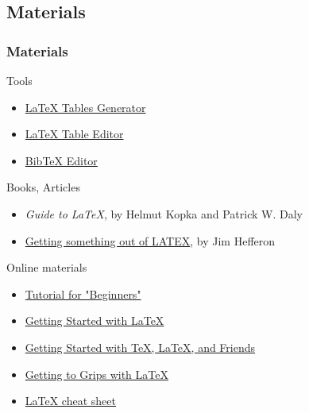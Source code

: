 \documentclass[slidestop,compress,mathserif]{beamer}
\begin{document}
\subsection[Materials]{Materials}
\begin{frame} 
		\frametitle{Materials}

		Tools
		\begin{itemize}
			\item \href{http://www.tablesgenerator.com/latex_tables}{LaTeX Tables Generator}
			\item \href{http://truben.no/table/}{LaTeX Table Editor}
			\item \href{http://truben.no/latex/bibtex/}{BibTeX Editor}
		\end{itemize}
		
		Books, Articles
		\begin{itemize}
			\item \emph{Guide to LaTeX}, by Helmut Kopka and Patrick W. Daly
			\item \href{http://mirror.physik-pool.tu-berlin.de/tex-archive/info/first-latex-doc/first-latex-doc.pdf}{Getting something out of LATEX}, by Jim Hef­feron
		\end{itemize}				
		
		Online materials
		\begin{itemize}
			\item \href{http://www.latex-tutorial.com/tutorials/beginners/}{Tutorial for "Beginners"}
			\item \href{http://www.math.uiuc.edu/~hildebr/tex/latex-start.html}{Getting Started with LaTeX}
			\item \href{https://www.tug.org/begin.html}{Getting Started with TeX, LaTeX, and Friends}
			\item \href{http://www.andy-roberts.net/writing/latexl}{Getting to Grips with LaTeX}
			\item \href{http://wch.github.io/latexsheet/}{LaTeX cheat sheet}
		\end{itemize}				
		
\end{frame}
\end{document}
